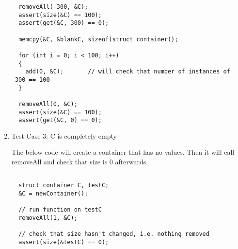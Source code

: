 \documentclass[11pt,letterpaper]{article}
\begin{document}
\begin{enumerate}
\begin{lstlisting}
  removeAll(-300, &C);
  assert(size(&C) == 100);
  assert(get(&C, 300) == 0);

  memcpy(&C, &blankC, sizeof(struct container));

  for (int i = 0; i < 100; i++) 
  {
    add(0, &C);       // will check that number of instances of -300 == 100
  }

  removeAll(0, &C);
  assert(size(&C) == 100);
  assert(get(&C, 0) == 0);

  \end{lstlisting}

  \item Test Case 3: C is completely empty 

    The below code will create a container that has no values. 
    Then it will call removeAll and check that size is 0 
    afterwards. 
  \begin{lstlisting}
  
  struct container C, testC;
  &C = newContainer();
  
  // run function on testC
  removeAll(1, &C);
  
  // check that size hasn't changed, i.e. nothing removed
  assert(size(&testC) == 0);

  \end{lstlisting}
\end{enumerate}
\end{document}
